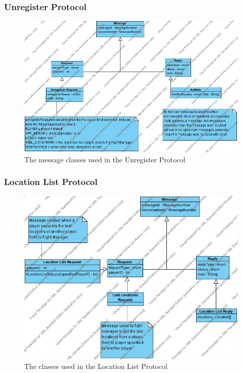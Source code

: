 \documentclass[12pt]{article}
\begin{document}
			\subsubsection{Unregister Protocol}
				\begin{center}
					\begin{figure}[htp]
						\centering
						\includegraphics[width=\linewidth]{Diagrams/Class Diagrams/Unregister Protocol.jpg}
						\caption{The message classes used in the Unregister Protocol}
					\end{figure}
				\end{center}
			\newpage
			\subsubsection{Location List Protocol}
				\begin{center}
					\begin{figure}[htp]
						\centering
						\includegraphics[width=\textwidth]{Diagrams/Class Diagrams/Location List Protocol.jpg}
						\caption{The classes used in the Location List Protocol}
					\end{figure}
				\end{center}
			\newpage
\end{document}
